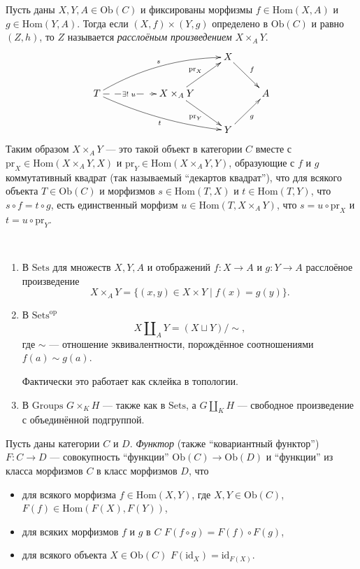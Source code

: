 \documentclass[12pt,a4paper]{article}
\newcommand{\op}{\mathrm{op}}
\newcommand{\Hom}{\mathrm{Hom}}
\newcommand{\Ob}{\mathrm{Ob}}
\newcommand{\id}{\mathrm{id}}
\newcommand{\Sets}{\mathrm{Sets}}
\newcommand{\Groups}{\mathrm{Groups}}
\newcommand{\pr}{\mathrm{pr}}
\begin{document}
    \begin{definition}
        Пусть даны $X, Y, A \in \Ob(C)$ и фиксированы морфизмы $f \in \Hom(X, A)$ и $g \in \Hom(Y, A)$. Тогда если $(X, f) \times (Y, g)$ определено в $\Ob(C)$ и равно $(Z, h)$, то $Z$ называется \emph{расслоёным произведением} $X \times_A Y$.
        \[
            \xymatrix{
                &&& X \ar[rd]^{f}\\
                T \ar@/^1em/[rrru]^{s} \ar@/_/[rrrd]_{t} \ar@{-->}[rr]|(0.4){\,\exists!\; u\,} && X \times_A Y \ar[ru]^{\pr_X} \ar[rd]_{\pr_Y} && A\\
                &&& Y \ar[ru]_{g}
            }
        \]
        Таким образом $X \times_A Y$ --- это такой объект в категории $C$ вместе с $\pr_X \in \Hom(X \times_A Y, X)$ и $\pr_Y \in \Hom(X \times_A Y, Y)$, образующие с $f$ и $g$ коммутативный квадрат (так называемый ``декартов квадрат''), что для всякого объекта $T \in \Ob(C)$ и морфизмов $s \in \Hom(T, X)$ и $t \in \Hom(T, Y)$, что $s \circ f = t \circ g$, есть единственный морфизм $u \in \Hom(T, X \times_A Y)$, что $s = u \circ \pr_X$ и $t = u \circ \pr_Y$.
    \end{definition}

    \begin{example}\ 
        \begin{enumerate}
            \item В $\Sets$ для множеств $X, Y, A$ и отображений $f: X \to A$ и $g: Y \to A$ расслоёное произведение
                \[X \times_A Y = \{(x, y) \in X \times Y \mid f(x) = g(y)\}.\]
            \item В $\Sets^\op$
                \[X \amalg_A Y = (X \sqcup Y) / {\sim},\]
                где $\sim$ --- отношение эквивалентности, порождённое соотношениями $f(a) \sim g(a)$.
                
                Фактически это работает как склейка в топологии.
            \item В $\Groups$ $G \times_K H$ --- также как в $\Sets$, а $G \amalg_K H$ --- свободное произведение с объединённой подгруппой.
        \end{enumerate}
    \end{example}

    \begin{definition}
        Пусть даны категории $C$ и $D$. \emph{Функтор} (также ``ковариантный функтор'') $F: C \to D$ --- совокупность ``функции'' $\Ob(C) \to \Ob(D)$ и ``функции'' из класса морфизмов $C$ в класс морфизмов $D$, что
        \begin{itemize}
            \item для всякого морфизма $f \in \Hom(X, Y)$, где $X, Y \in \Ob(C)$, $F(f) \in \Hom(F(X), F(Y))$,
            \item для всяких морфизмов $f$ и $g$ в $C$ $F(f \circ g) = F(f) \circ F(g)$,
            \item для всякого объекта $X \in \Ob(C)$ $F(\id_X) = \id_{F(X)}$.
        \end{itemize}
    \end{definition}
\end{document}

